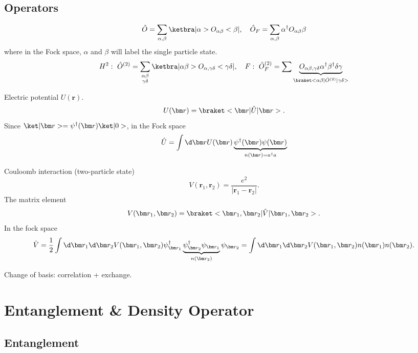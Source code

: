 \subsection{Operators}

\[
  \hat O = \sum_{\alpha,\beta}\ketbra|\alpha>O_{\alpha\beta}<\beta|,\quad
  \hat O_F = \sum_{\alpha,\beta} \alpha^\dagger O_{\alpha\beta}\beta
\]
where in the Fock space, $\alpha$ and $\beta$ will label the single
particle state.
\[
  H^2:\ \hat O^{(2)} = \sum_{\substack{\alpha\beta\\\gamma\delta}}
    \ketbra|\alpha\beta>O_{\alpha,\gamma\delta}<\gamma\delta|,\quad
  F:\ \hat O_F^{(2)} = \sum \underbrace{O_{\alpha\beta,\gamma\delta}
    \alpha^\dagger \beta^\dagger \delta\gamma}_
    {\braket<\alpha\beta|\hat O^{(2)}|\gamma\delta>}
\]
\begin{example}
  Electric potential $U(\bm r)$.
  \[
    U(\bm r) = \braket<\bm r|\hat U|\bm r>.
  \]
  Since $\ket|\bm r> = \psi^\dagger(\bm r) \ket|0>$, in the Fock space
  \[
    \hat U = \int \d\bm r U(\bm r)
    \underbrace{\psi^\dagger(\bm r) \psi(\bm r)}_{n(\bm r) = a^\dagger a}
  \]
\end{example}
\begin{example}
  Couloomb interaction (two-particle state)
  \[
    V(\bm r_1,\bm r_2) = \frac{e^2}{|\bm r_1 - \bm r_2|}.
  \]
  The matrix element
  \[
    V(\bm r_1, \bm r_2) = \braket<\bm r_1,\bm r_2|\hat V|\bm r_1,\bm r_2>.
  \]
  In the fock space
  \[
    \hat V = \frac12 \int \d\bm r_1 \d\bm r_2 V(\bm r_1,\bm r_2)
    \psi_{\bm r_1}^\dagger \underbrace{\psi_{\bm r_2}^\dagger
    \psi_{\bm r_1}}_{n(\bm r_2)} \psi_{\bm r_2}
  = \int \d\bm r_1 \d\bm r_2 V(\bm r_1,\bm r_2) n(\bm r_1) n(\bm r_2).
  \]
\end{example}
Change of basis: correlation + exchange.

\section{Entanglement \& Density Operator}

\subsection{Entanglement}

